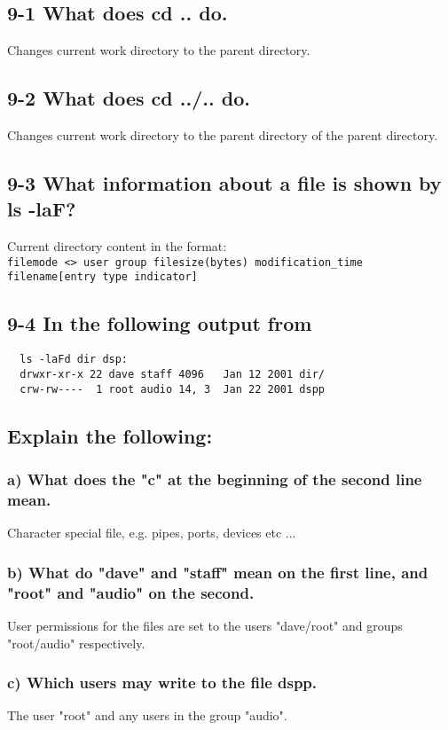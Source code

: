 \subsection{9-1 What does cd .. do.}
Changes current work directory to the parent directory.

\subsection{9-2 What does cd ../.. do.}
Changes current work directory to the parent directory of the parent directory.

\subsection{9-3 What information about a file is shown by ls -laF?}
Current directory content in the format:\\
\verb=filemode <> user group filesize(bytes) modification_time filename[entry type indicator]=

\subsection{9-4 In the following output from}
\begin{verbatim}
  ls -laFd dir dsp:
  drwxr-xr-x 22 dave staff 4096   Jan 12 2001 dir/
  crw-rw----  1 root audio 14, 3  Jan 22 2001 dspp
\end{verbatim}
\subsection{Explain the following:}
\subsubsection{a) What does the "c" at the beginning of the second line mean.}
Character special file, e.g. pipes, ports, devices etc ...

\subsubsection{b) What do "dave" and "staff" mean on the first line, and "root" and "audio" on the second.}
User permissions for the files are set to the users "dave/root" and groups "root/audio" respectively.

\subsubsection{c) Which users may write to the file dspp.}
The user "root" and any users in the group "audio".

